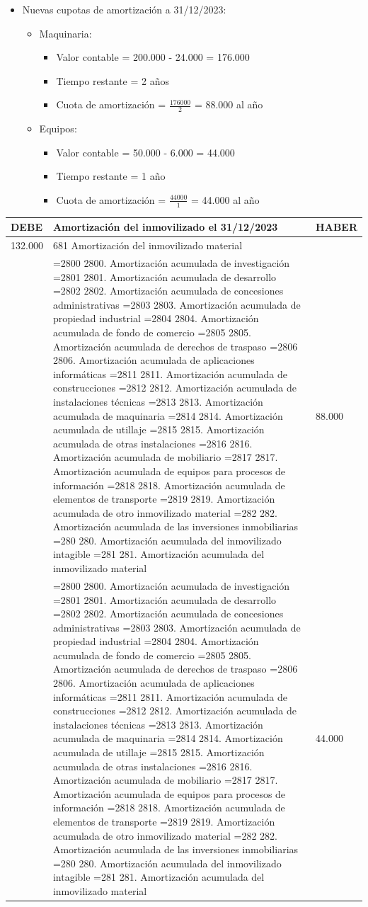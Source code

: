 \documentclass[a4paper,12pt]{article}
\newcommand{\fec}{31/12/}
\newcommand{\VC}{Valor contable = }
\newcommand{\cuotaamort}{Cuota de amortización = }
\newcommand{\myequation}[2]{\ensuremath{\frac{#1}{#2}}}
\newcommand{\cuenta}[1]{
    \ifnum#1=2800 2800. Amortización acumulada de investigación\fi
    \ifnum#1=2801 2801. Amortización acumulada de desarrollo\fi
    \ifnum#1=2802 2802. Amortización acumulada de concesiones administrativas\fi
    \ifnum#1=2803 2803. Amortización acumulada de propiedad industrial\fi
    \ifnum#1=2804 2804. Amortización acumulada de fondo de comercio\fi
    \ifnum#1=2805 2805. Amortización acumulada de derechos de traspaso\fi
    \ifnum#1=2806 2806. Amortización acumulada de aplicaciones informáticas\fi
    \ifnum#1=2811 2811. Amortización acumulada de construcciones\fi
    \ifnum#1=2812 2812. Amortización acumulada de instalaciones técnicas\fi
    \ifnum#1=2813 2813. Amortización acumulada de maquinaria\fi
    \ifnum#1=2814 2814. Amortización acumulada de utillaje\fi
    \ifnum#1=2815 2815. Amortización acumulada de otras instalaciones\fi
    \ifnum#1=2816 2816. Amortización acumulada de mobiliario\fi
    \ifnum#1=2817 2817. Amortización acumulada de equipos para procesos de información\fi
    \ifnum#1=2818 2818. Amortización acumulada de elementos de transporte\fi
    \ifnum#1=2819 2819. Amortización acumulada de otro inmovilizado material\fi
    \ifnum#1=282 282. Amortización acumulada de las inversiones inmobiliarias\fi
    \ifnum#1=280 280. Amortización acumulada del inmovilizado intagible\fi
    \ifnum#1=281 281. Amortización acumulada del inmovilizado material\fi
}
\begin{document}
\begin{itemize}
    \item Nuevas cupotas de amortización a \fec2023:
    \begin{itemize}
        \item Maquinaria:
        \begin{itemize}
            \item \VC 200.000 - 24.000 = 176.000
            \item Tiempo restante = 2 años
            \item \cuotaamort \myequation{176000}{2} = 88.000 al año
        \end{itemize}
        \item Equipos:
        \begin{itemize}
            \item \VC 50.000 - 6.000 = 44.000
            \item Tiempo restante = 1 año
            \item \cuotaamort \myequation{44000}{1} = 44.000 al año
        \end{itemize}
    \end{itemize}
\end{itemize}

\begin{table}[H]
    \centering
    \begin{tabular}{|p{3cm}|p{6cm}|p{3cm}|}
    \hline
    \textbf{DEBE} & \textbf{Amortización del inmovilizado el \fec2023} & \textbf{HABER} \\
    \hline
    132.000& 681 Amortización del inmovilizado material& \\
    \hline
    & \cuenta{2813}&88.000 \\
    \hline
    & \cuenta{2817}& 44.000\\
    \hline
    \end{tabular}
\end{table}
\end{document}
